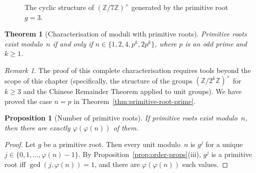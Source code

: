 \documentclass[12pt,a4paper,openany]{book}
\theoremstyle{definition}
\theoremstyle{plain}
\newtheorem{theorem}[definition]{Theorem}
\newtheorem{proposition}[definition]{Proposition}
\theoremstyle{remark}
\newtheorem{remark}[definition]{Remark}
\newcommand{\Z}{\mathbb{Z}}
\begin{document}
\begin{figure}[ht]
\centering
{}
\caption{The cyclic structure of $(\Z/7\Z)^\times$ generated by the primitive root $g = 3$.}
\label{fig:cyclic-Z7}
\end{figure}

\begin{theorem}[Characterisation of moduli with primitive roots]
\label{thm:prim-root-exist}
Primitive roots exist modulo~$n$ if and only if
$n \in \{1, 2, 4, p^k, 2p^k\}$, where $p$ is an odd prime and $k \ge 1$.
\end{theorem}

\begin{remark}
\label{rem:prim-root-exist-proof}
The proof of this complete characterisation requires tools beyond the
scope of this chapter (specifically, the structure of the groups
$(\Z/2^k\Z)^\times$ for $k \ge 3$ and the Chinese Remainder Theorem
applied to unit groups).  We have proved the case $n = p$ in
Theorem~\ref{thm:primitive-root-prime}.
\end{remark}

\begin{proposition}[Number of primitive roots]
\label{prop:count-prim-roots}
If primitive roots exist modulo~$n$, then there are exactly
$\varphi(\varphi(n))$ of them.
\end{proposition}

\begin{proof}
Let $g$ be a primitive root.  Then every unit modulo~$n$ is $g^j$ for a
unique $j \in \{0, 1, \dots, \varphi(n)-1\}$.  By
Proposition~\ref{prop:order-props}(iii), $g^j$ is a primitive root iff
$\gcd(j, \varphi(n)) = 1$, and there are $\varphi(\varphi(n))$ such values.
\end{proof}
\end{document}
